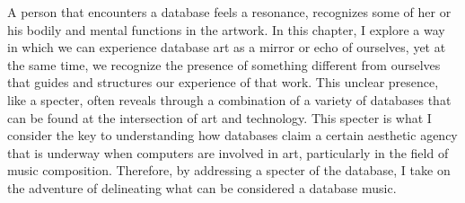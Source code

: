 A person that encounters a database feels a resonance, recognizes some of her or his bodily and mental functions in the artwork. In this chapter, I explore a way in which we can experience database art as a mirror or echo of ourselves, yet at the same time, we recognize the presence of something different from ourselves that guides and structures our experience of that work. This unclear presence, like a specter, often reveals through a combination of a variety of databases that can be found at the intersection of art and technology. This specter is what I consider the key to understanding how databases claim a certain aesthetic agency that is underway when computers are involved in art, particularly in the field of music composition. Therefore, by addressing a specter of the database, I take on the adventure of delineating what can be considered a database music.
